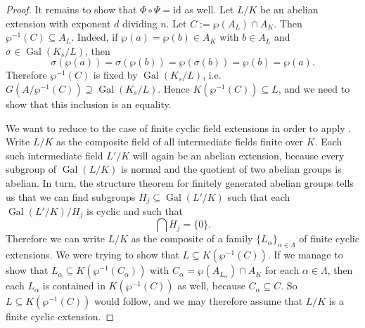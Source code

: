\documentclass[12pt]{amsart}
\DeclareMathOperator{\Gal}{Gal}
\newcommand{\id}{\mathrm{id}}
\begin{document}
\begin{thm}
\begin{proof}
	It remains to show that $\Phi\circ \Psi=\id$ as well.
	Let $L/K$ be an abelian extension with exponent $d$ dividing $n$.
	Let $C:=\wp(A_{L})\cap A_{K}$.
	Then $\wp^{-1}(C)\subseteq A_{L}$.
	Indeed, if $\wp(a)=\wp(b)\in A_{K}$ with $b\in A_{L}$ and $\sigma\in \Gal(K_{s}/L)$, then
	\[ \sigma(\wp(a))=\sigma(\wp(b))=\wp(\sigma(b))=\wp(b)=\wp(a). \]
	Therefore $\wp^{-1}(C)$ is fixed by $\Gal(K_{s}/L)$, i.e.~$G(A/\wp^{-1}(C))\supseteq \Gal(K_{s}/L)$.
	Hence $K(\wp^{-1}(C))\subseteq L$, and we need to show that this inclusion is an equality.
	
	We want to reduce to the case of finite cyclic field extensions in order to apply .
	Write $L/K$ as the composite field of all intermediate fields finite over $K$.
	Each such intermediate field $L'/K$ will again be an abelian extension, because every subgroup of $\Gal(L/K)$ is normal and the quotient of two abelian groups is abelian.
	In turn, the structure theorem for finitely generated abelian groups tells us that we can find subgroups $H_{j}\subseteq \Gal(L'/K)$ such that each $\Gal(L'/K)/H_{j}$ is cyclic and such that
	\[ \bigcap H_{j}=\{ 0 \}. \]
	Therefore we can write $L/K$ as the composite of a family $\{ L_{\alpha}\}_{\alpha\in \Lambda}$  of finite cyclic extensions.
	We were trying to show that $L\subseteq K(\wp^{-1}(C))$.
	If we manage to show that $L_{\alpha}\subseteq K(\wp^{-1}(C_{\alpha}))$ with $C_{\alpha}=\wp(A_{L_{\alpha}})\cap A_{K}$ for each $\alpha\in \Lambda$, then each $L_{\alpha}$ is contained in $K(\wp^{-1}(C))$ as well, because $C_{\alpha}\subseteq C$.
	So $L\subseteq K(\wp^{-1}(C))$ would follow, and we may therefore assume that $L/K$ is a finite cyclic extension.


\end{proof}
\end{thm}
\end{document}

